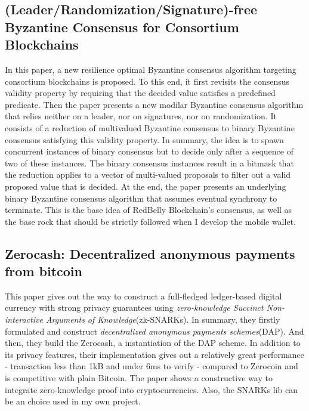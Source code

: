 \subsection{(Leader/Randomization/Signature)-free Byzantine Consensus for Consortium Blockchains\cite{DBLP:journals/corr/CrainGLR17}}

In this paper, a new resilience optimal Byzantine consensus algorithm targeting consortium blockchains is proposed. 
To this end, it first revisits the consensus validity property by requiring that the decided value
satisfies a predefined predicate. Then the paper presents a new modilar Byzantine consensus algorithm that relies 
neither on a leader, nor on signatures, nor on randomization. It consists of a reduction of multivalued 
Byzantine consensus to binary Byzantine consensus
satisfying this validity property.  In summary, the idea is to spawn concurrent instances of binary consensus but to decide
only after a sequence of two of these instances. The binary consensus instances result in a bitmask that the
reduction applies to a vector of multi-valued proposals to filter out a valid proposed value that is decided. 
At the end, the paper presents an underlying binary Byzantine consensus algorithm that assumes eventual synchrony
to terminate. This is the base idea of RedBelly Blockchain's consensus, as well as the base rock that should be 
strictly followed when I develop the mobile wallet.

\subsection{Zerocash: Decentralized anonymous payments from bitcoin\cite{sasson2014zerocash}}

This paper gives out the way to construct a full-fledged ledger-based digital currency with strong 
privacy guarantees using \textit{zero-knowledge Succinct Non-interactive Arguments of Knowledge}(zk-SNARKs).
In summary, they firstly formulated and construct \textit{decentralized anonymous payments schemes}(DAP).
And then, they build the Zerocash, a instantiation of the DAP scheme. In addition to its privacy
features, their implementation gives out a relatively great performance - transaction less than 1kB and 
under 6ms to verify - compared to Zerocoin and is competitive with plain Bitcoin. The paper shows a
constructive way to integrate zero-knowledge proof into cryptocurrencies. Also, the SNARKs lib can be an 
choice used in my own project.

